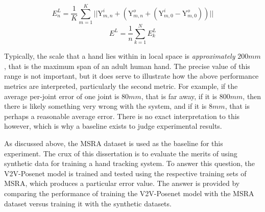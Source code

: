 \begin{equation}
    E^{L}_{n} = \frac{1}{K}\sum_{m=1}^{K} ||\bm{\mathrm{Y}}^{i}_{m,n} + (\bm{\mathrm{Y}}^{o}_{m,n} + (\bm{\mathrm{Y}}^{i}_{m,0} - \bm{\mathrm{Y}}^{o}_{m,0}))||
\end{equation}
\begin{equation}
    E^{L} = \frac{1}{n}\sum_{k=1}^{N} E^{L}_{k}
\end{equation}

Typically, the scale that a hand lies within in local space is {\slshape approximately} $200mm$, that is the maximum span of an adult human hand. The precise value of this range is not important, but it does serve to illustrate how the above performance metrics are interpreted, particularly the second metric. For example, if the average per-joint error of one joint is $80mm$, that is far away, if it is $800mm$, then there is likely something very wrong with the system, and if it is $8mm$, that is perhaps a reasonable average error. There is no exact interpretation to this however, which is why a baseline exists to judge experimental results.

As discussed above, the MSRA dataset is used as the baseline for this experiment. The crux of this dissertation is to evaluate the merits of using synthetic data for training a hand tracking system. To answer this question, the V2V-Posenet model is trained and tested using the respective training sets of MSRA, which produces a particular error value. The answer is provided by comparing the performance of training the V2V-Posenet model with the MSRA dataset versus training it with the synthetic datasets.


